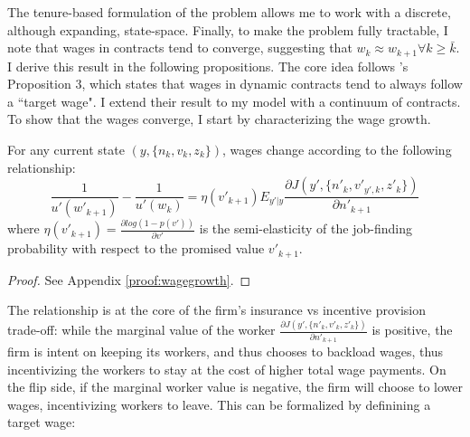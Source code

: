 The tenure-based formulation of the problem allows me to work with a discrete, although expanding, state-space. Finally, to make the problem fully tractable, I note that wages in contracts tend to converge, suggesting that $w_k\approx w_{k+1} \forall k\geq\bar{k}$. I derive this result in the following propositions. The core idea follows \textcite{balke2022}'s Proposition 3, which states that wages in dynamic contracts tend to always follow a ``target wage". I extend their result to my model with a continuum of contracts.
\newline
To show that the wages converge, I start by characterizing the wage growth.
\begin{proposition} \label{prop:wagegrowth}
  For any current state $(y,\{n_k,v_k,z_k\})$, wages change according to the following relationship:
\begin{equation} 
    \frac{1}{u'(w'_{k+1})} - \frac{1}{u'(w_k)} = \eta(v'_{k+1}) E_{y'|y} \frac{\partial J(y',\{n'_k,v'_{y',k},z'_k\})}{\partial n'_{k+1}}
\end{equation}
where $\eta(v'_{k+1}) = \frac{\partial log(1-p(v'))}{\partial v'}$ is the semi-elasticity of the job-finding probability with respect to the promised value $v'_{k+1}$.
\end{proposition}
\begin{proof}
  See Appendix \ref{proof:wagegrowth}.
\end{proof}
The relationship is at the core of the firm's insurance vs incentive provision trade-off: while the marginal value of the worker $\frac{\partial J(y',\{n'_k,v'_k,z'_k\})}{\partial n'_{k+1}}$ is positive, the firm is intent on keeping its workers, and thus chooses to backload wages, thus incentivizing the workers to stay at the cost of higher total wage payments. On the flip side, if the marginal worker value is negative, the firm will choose to lower wages, incentivizing workers to leave. This can be formalized by definining a target wage:
 

